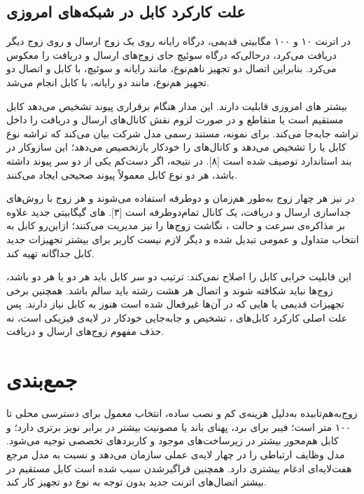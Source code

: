 \subsection{علت کارکرد کابل  در شبکه‌های امروزی}

در اترنت ۱۰ و ۱۰۰ مگابیتی قدیمی، درگاه  رایانه روی یک زوج ارسال و روی زوج دیگر دریافت می‌کرد،
درحالی‌که درگاه  سوئیچ جای زوج‌های ارسال و دریافت را معکوس می‌کرد.
بنابراین اتصال دو تجهیز ناهم‌نوع، مانند رایانه و سوئیچ، با کابل  و اتصال دو تجهیز هم‌نوع، مانند دو رایانه، با کابل  انجام می‌شد.

بیشتر های امروزی قابلیت  دارند.
این مدار هنگام برقراری پیوند تشخیص می‌دهد کابل مستقیم است یا متقاطع و در صورت لزوم نقش کانال‌های ارسال و دریافت را داخل تراشه جابه‌جا می‌کند.
برای نمونه، مستند رسمی  مدل  شرکت  بیان می‌کند که تراشه نوع کابل  یا  را تشخیص می‌دهد و کانال‌های  را خودکار بازتخصیص می‌دهد؛
این سازوکار در بند  استاندارد  توصیف شده است [۸].
در نتیجه، اگر دست‌کم یکی از دو سر پیوند  داشته باشد، هر دو نوع کابل معمولاً پیوند صحیحی ایجاد می‌کنند.

در  نیز هر چهار زوج به‌طور هم‌زمان و دوطرفه استفاده می‌شوند و هر زوج با روش‌های جداسازی ارسال و دریافت، یک کانال تمام‌دوطرفه است [۳].
های گیگابیتی جدید علاوه بر مذاکره‌ی سرعت و حالت ، نگاشت زوج‌ها را نیز مدیریت می‌کنند؛
ازاین‌رو کابل  به انتخاب متداول و عمومی تبدیل شده و دیگر لازم نیست کاربر برای بیشتر تجهیزات جدید کابل  جداگانه تهیه کند.

این قابلیت خرابی کابل را اصلاح نمی‌کند:
ترتیب دو سر کابل  باید هر دو  یا هر دو  باشد، زوج‌ها نباید شکافته شوند و اتصال هر هشت رشته باید سالم باشد.
همچنین برخی تجهیزات قدیمی یا هایی که  در آن‌ها غیرفعال شده است هنوز به کابل  نیاز دارند.
پس علت اصلی کارکرد کابل‌های ، تشخیص و جابه‌جایی خودکار  در لایه‌ی فیزیکی است، نه حذف مفهوم زوج‌های ارسال و دریافت.

\section{جمع‌بندی}

زوج‌به‌هم‌تابیده به‌دلیل هزینه‌ی کم و نصب ساده، انتخاب معمول برای دسترسی محلی تا ۱۰۰ متر است؛
فیبر برای برد، پهنای باند یا مصونیت بیشتر در برابر نویز برتری دارد؛
و کابل هم‌محور بیشتر در زیرساخت‌های موجود و کاربردهای تخصصی توجیه می‌شود.
مدل  وظایف ارتباطی را در چهار لایه‌ی عملی سازمان می‌دهد و نسبت به مدل مرجع هفت‌لایه‌ای  ادغام بیشتری دارد.
همچنین فراگیرشدن  سبب شده است کابل مستقیم در بیشتر اتصال‌های اترنت جدید بدون توجه به نوع دو تجهیز کار کند.

